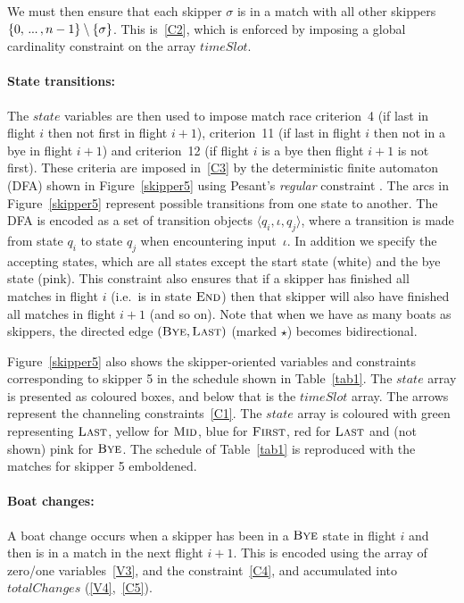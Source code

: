 \documentclass{llncs}
\newcommand{\timeSlot}{\mathit{timeSlot}}
\newcommand{\state}{\mathit{state}}
\newcommand{\totalChanges}{\mathit{totalChanges}}
\newcommand{\FIRST}{\textnormal{\textsc{First}}}
\newcommand{\MID}{\textnormal{\textsc{Mid}}}
\newcommand{\LAST}{\textnormal{\textsc{Last}}}
\newcommand{\END}{\textnormal{\textsc{End}}}
\newcommand{\BYE}{\textnormal{\textsc{Bye}}}
\newcommand\nldots{\,\hbox to 0.8em{.\hss.\hss.}\,}
\begin{document}
We must then ensure that each skipper $\sigma$ is in a match with all other skippers $\{0, \nldots,
n-1\} \setminus \{\sigma\}$. This is~\eqref{C2}, which is enforced by imposing a global
cardinality constraint \cite{globCard} on the array $\timeSlot$.

\paragraph{State transitions:} The $\state$ variables are then used to impose match race criterion~4
(if last in flight $i$ then not first in flight $i+1$), criterion~11 (if last in flight $i$ then not
in a bye in flight $i+1$) and criterion~12 (if flight $i$ is a bye then flight $i+1$ is not first).
These criteria are imposed in~\eqref{C3} by the deterministic finite automaton (DFA) shown in
Figure~\ref{skipper5} using Pesant's \emph{regular} constraint \cite{Pesant04}. The arcs in
Figure~\ref{skipper5} represent possible transitions from one state to another. The DFA is encoded
as a set of transition objects $\langle q_{i},\iota,q_{j} \rangle$, where a transition is made from
state $q_{i}$ to state $q_{j}$ when encountering input~$\iota$. In addition we specify the accepting
states, which are all states except the start state (white) and the bye state (pink).  This
constraint also ensures that if a skipper has finished all matches in flight $i$ (i.e.\ is in state
$\END$) then that skipper will also have finished all matches in flight $i+1$ (and so on). Note that
when we have as many boats as skippers, the directed edge $(\BYE,\LAST)$ (marked $\star$) becomes
bidirectional.

Figure~\ref{skipper5} also shows the skipper-oriented variables and constraints corresponding to
skipper 5 in the schedule shown in Table~\ref{tab1}. The $\state$ array is presented as coloured boxes, and
below that is the $\timeSlot$ array. The arrows represent the channeling constraints~\eqref{C1}. The
$\state$ array is coloured with green representing $\LAST$, yellow for $\MID$, blue for $\FIRST$,
red for $\LAST$ and (not shown) pink for $\BYE$. The schedule of Table~\ref{tab1} is reproduced with
the matches for skipper 5 emboldened. 

\paragraph{Boat changes:} A boat change occurs when a skipper has been in a $\BYE$ state in flight
$i$ and then is in a match in the next flight $i+1$.  This is encoded using the array of zero/one
variables~\eqref{V3}, and the constraint~\eqref{C4}, and accumulated into $\totalChanges$
(\ref{V4},~\ref{C5}).
\end{document}
